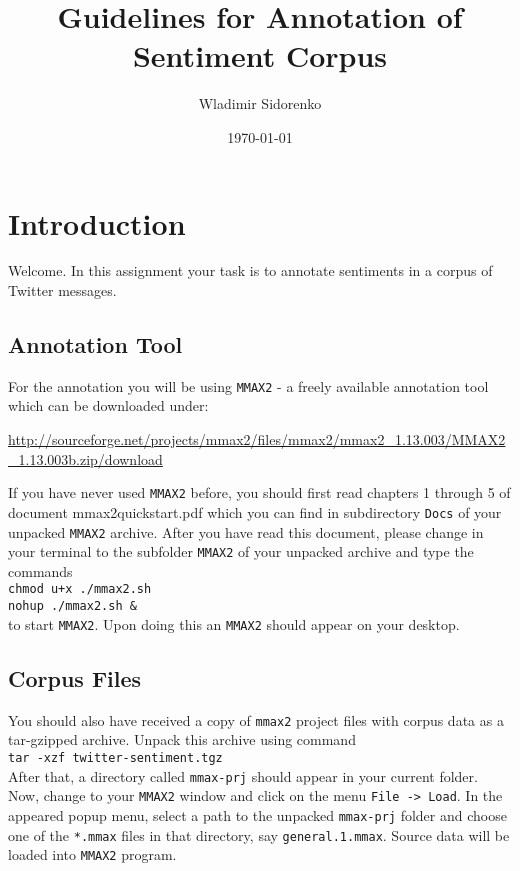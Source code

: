 \documentclass[11pt,a4paper]{article}
\author{Wladimir Sidorenko}
\date{\today}
\title{Guidelines for Annotation of Sentiment Corpus}
\begin{document}
\maketitle{}
\section{Introduction}
Welcome. In this assignment your task is to annotate sentiments in a
corpus of Twitter messages.

\subsection{Annotation Tool}

For the annotation you will be using \texttt{MMAX2} - a freely
available annotation tool which can be downloaded under:

\url{http://sourceforge.net/projects/mmax2/files/mmax2/mmax2_1.13.003/MMAX2_1.13.003b.zip/download}

If you have never used \texttt{MMAX2} before, you should first read
chapters 1 through 5 of document mmax2quickstart.pdf which you can
find in subdirectory \texttt{Docs} of your unpacked \texttt{MMAX2}
archive. After you have read this document, please change in your
terminal to the subfolder \texttt{MMAX2} of your unpacked archive and
type the commands\\ \texttt{chmod u+x ./mmax2.sh}\\ \texttt{nohup
  ./mmax2.sh \&}\\ to start \texttt{MMAX2}. Upon doing this an
\texttt{MMAX2} should appear on your desktop.

\subsection{Corpus Files}

You should also have received a copy of \texttt{mmax2} project files
with corpus data as a tar-gzipped archive. Unpack this archive using
command\\\texttt{tar -xzf twitter-sentiment.tgz}\\After that, a
directory called \texttt{mmax-prj} should appear in your current
folder. Now, change to your \texttt{MMAX2} window and click on the
menu \texttt{File -> Load}. In the appeared popup menu, select a path
to the unpacked \texttt{mmax-prj} folder and choose one of the
\texttt{*.mmax} files in that directory, say
\texttt{general.1.mmax}. Source data will be loaded into
\texttt{MMAX2} program.
\end{document}
